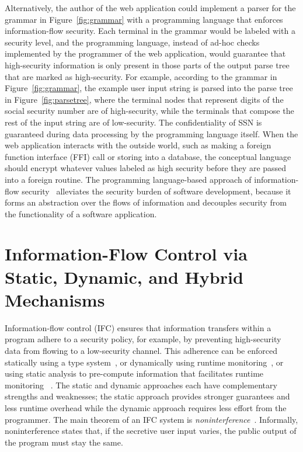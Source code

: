 Alternatively, the author of the web application could implement a parser for
the grammar in Figure~\ref{fig:grammar} with a programming language that
enforces information-flow security. Each terminal in the grammar would be
labeled with a security level, and the programming language, instead of ad-hoc
checks implemented by the programmer of the web application, would guarantee
that high-security information is only present in those parts of the output
parse tree that are marked as high-security. For example, according to the
grammar in Figure~\ref{fig:grammar}, the example user input string is parsed
into the parse tree in Figure~\ref{fig:parsetree}, where the terminal nodes that
represent digits of the social security number are of {\color{red}
  high-security}, while the terminals that compose the rest of the input string
are of {\color{green} low-security}. The confidentiality of SSN is guaranteed
during data processing by the programming language itself. When the web
application interacts with the outside world, such as making a foreign function
interface (FFI) call or storing into a database, the conceptual language should
encrypt whatever values labeled as high security before they are passed into a
foreign routine. The programming language-based approach of information-flow
security~\parencite{sabelfeld2003language} alleviates the security burden of
software development, because it forms an abstraction over the flows of
information and decouples security from the functionality of a software
application.


\section{Information-Flow Control via Static, Dynamic, and Hybrid Mechanisms}


Information-flow control (IFC) ensures that information transfers within a
program adhere to a security policy, for example, by preventing high-security
data from flowing to a low-security channel. This adherence can be enforced
statically using a type
system~\parencite{volpano1996sound,Myers:1997aa,myers1999jflow}, or dynamically
using runtime
monitoring~\parencite{Askarov:2009vq,austin2009efficient,Devriese:2010up,stefan2011flexible,Austin:2017uh,Xiang:2021ub},
or using static analysis to pre-compute information that facilitates runtime
monitoring
~\parencite{le2005monitoring,le2007automaton,Chandra:2007we,Shroff:2007tg,russo2010dynamic,moore2011static}.
The static and dynamic approaches each have complementary strengths and
weaknesses; the static approach provides stronger guarantees and less runtime
overhead while the dynamic approach requires less effort from the programmer.
The main theorem of an IFC system is
\textit{noninterference}~\cite{goguen1982security}. Informally, noninterference
states that, if the secretive user input varies, the public output of the
program must stay the same.

